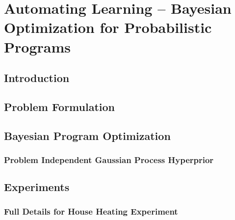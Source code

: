 %

\chapter{Automating Learning -- Bayesian Optimization for Probabilistic Programs}
\label{chp:bopp}



\section{Introduction} 
\label{sec:IntroductionBOPP}



\section{Problem Formulation}
\label{sec:problem}



\section{Bayesian Program Optimization}
\label{sec:bopp}



\subsection{Problem Independent Gaussian Process Hyperprior}
\label{sec:app:hyperprior}



\section{Experiments}




\subsection{Full Details for House Heating Experiment}
\label{sec:app:heating}


